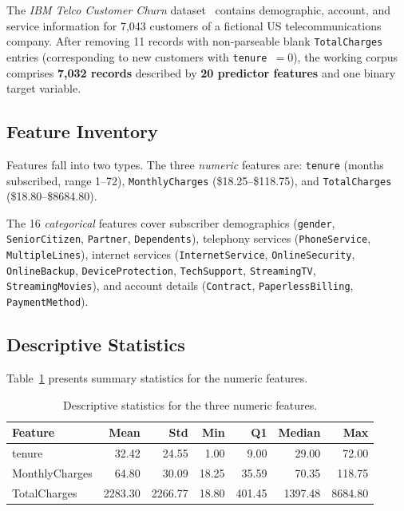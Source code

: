 \documentclass{llncs}
\begin{document}
The \emph{IBM Telco Customer Churn} dataset~\cite{kaggle_telco}
contains demographic, account, and service information for 7{,}043
customers of a fictional US telecommunications company.
After removing 11 records with non-parseable blank \texttt{TotalCharges}
entries (corresponding to new customers with \texttt{tenure}~$= 0$),
the working corpus comprises \textbf{7{,}032 records} described by
\textbf{20 predictor features} and one binary target variable.

\subsection{Feature Inventory}

Features fall into two types. The three \emph{numeric} features are:
\texttt{tenure} (months subscribed, range 1--72), \texttt{MonthlyCharges}
(\$18.25--\$118.75), and \texttt{TotalCharges} (\$18.80--\$8684.80).
\begin{sloppypar}
The 16 \emph{categorical} features cover subscriber demographics
(\texttt{gender}, \texttt{SeniorCitizen}, \texttt{Partner},
\texttt{Dependents}), telephony services (\texttt{PhoneService},
\texttt{MultipleLines}), internet services (\texttt{InternetService},
\texttt{OnlineSecurity}, \texttt{OnlineBackup}, \texttt{DeviceProtection},
\texttt{TechSupport}, \texttt{StreamingTV}, \texttt{StreamingMovies}),
and account details (\texttt{Contract}, \texttt{PaperlessBilling},
\texttt{PaymentMethod}).
\end{sloppypar}

\subsection{Descriptive Statistics}

Table~\ref{tab:descstats} presents summary statistics for the
numeric features.

\begin{table}[t]
\centering
\caption{Descriptive statistics for the three numeric features.}
\label{tab:descstats}
\renewcommand{\arraystretch}{1.15}
\begin{tabular}{@{}lrrrrrr@{}}
\toprule
\textbf{Feature}   & \textbf{Mean}  & \textbf{Std}   & \textbf{Min} &
                     \textbf{Q1}    & \textbf{Median}& \textbf{Max}  \\
\midrule
tenure             & 32.42  & 24.55  & 1.00  & 9.00  & 29.00   & 72.00  \\
MonthlyCharges     & 64.80  & 30.09  & 18.25 & 35.59 & 70.35   & 118.75 \\
TotalCharges       & 2283.30& 2266.77& 18.80 & 401.45& 1397.48 & 8684.80\\
\bottomrule
\end{tabular}
\end{table}
\end{document}
